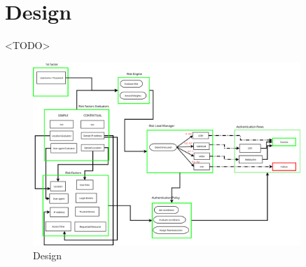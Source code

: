 \chapter{Design}
\shorthandoff{-}

<TODO>
\begin{figure}
    \centering
    \includegraphics[width=0.9\textwidth]{img/Design1.0.png}
    \caption{Design}
    \label{fig:design}
\end{figure}